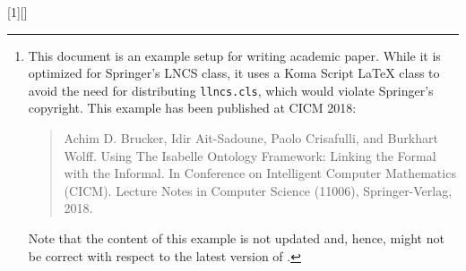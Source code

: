 \usepackage[scaled=0.88]{beramono}
\usepackage{textcomp}
\usepackage{xcolor}
\usepackage{paralist}
\usepackage{listings}
\usepackage{lstisadof}
\usepackage{xspace}
\usepackage[draft]{fixme}

%

[1][]{\lstset{style=displaybash, #1}}{}
\def\inlinebash{\lstinline[style=bash, breaklines=true,columns=fullflexible]}

\usepackage[caption]{subfig}
\usepackage[size=footnotesize]{caption}

\newcommand{\ie}{i.e.}
\newcommand{\eg}{e.g.}


\subject{Example of an Academic Paper\footnote{%
  This document is an example setup for writing academic paper. While
  it is optimized for Springer's LNCS class, it uses a Koma Script
  LaTeX class to avoid the need for distributing \texttt{llncs.cls},
  which would violate Springer's copyright. This example has been
  published at CICM 2018:
    \protect\begin{quote}
      Achim D. Brucker, Idir Ait-Sadoune, Paolo Crisafulli, and
      Burkhart Wolff. Using The Isabelle Ontology Framework: Linking
      the Formal with the Informal. In Conference on Intelligent
      Computer Mathematics (CICM). Lecture Notes in Computer Science
      (11006), Springer-Verlag, 2018. 
    \protect\end{quote}
    Note that the content of this example is not updated and, hence,
    might not be correct with respect to the latest version of
    \isadof{}. 
    }}

